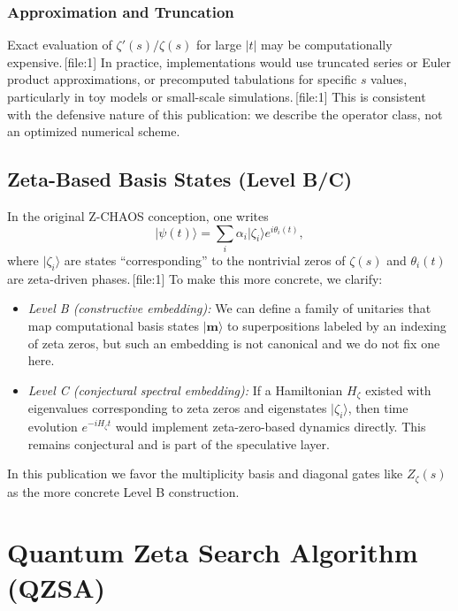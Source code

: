 \documentclass[11pt]{article}
\begin{document}
\subsubsection{Approximation and Truncation}

Exact evaluation of \(\zeta'(s)/\zeta(s)\) for large \(|t|\) may be computationally expensive.\,[file:1] In practice, implementations would use truncated series or Euler product approximations, or precomputed tabulations for specific \(s\) values, particularly in toy models or small-scale simulations.\,[file:1] This is consistent with the defensive nature of this publication: we describe the operator class, not an optimized numerical scheme.

\subsection{Zeta-Based Basis States (Level B/C)}

In the original Z-CHAOS conception, one writes
\[
\lvert \psi(t) \rangle = \sum_i \alpha_i \lvert \zeta_i \rangle e^{i \theta_i(t)},
\]
where \(\lvert \zeta_i \rangle\) are states ``corresponding'' to the nontrivial zeros of \(\zeta(s)\) and \(\theta_i(t)\) are zeta-driven phases.\,[file:1] To make this more concrete, we clarify:

\begin{itemize}[leftmargin=*]
    \item \emph{Level B (constructive embedding):} We can define a family of unitaries that map computational basis states \(\lvert \mathbf{m} \rangle\) to superpositions labeled by an indexing of zeta zeros, but such an embedding is not canonical and we do not fix one here.
    \item \emph{Level C (conjectural spectral embedding):} If a Hamiltonian \(H_\zeta\) existed with eigenvalues corresponding to zeta zeros and eigenstates \(\lvert \zeta_i \rangle\), then time evolution \(e^{-i H_\zeta t}\) would implement zeta-zero-based dynamics directly. This remains conjectural and is part of the speculative layer.
\end{itemize}

In this publication we favor the multiplicity basis and diagonal gates like \(Z_\zeta(s)\) as the more concrete Level B construction.

\section{Quantum Zeta Search Algorithm (QZSA)}
\label{sec:QZSA}
\end{document}
